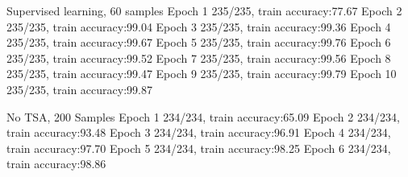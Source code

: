 \documentclass[a4paper]{article}
\begin{document}
Supervised learning, 60 samples
Epoch 1 235/235, train accuracy:77.67%
Epoch 2 235/235, train accuracy:99.04%
Epoch 3 235/235, train accuracy:99.36%
Epoch 4 235/235, train accuracy:99.67%
Epoch 5 235/235, train accuracy:99.76%
Epoch 6 235/235, train accuracy:99.52%
Epoch 7 235/235, train accuracy:99.56%
Epoch 8 235/235, train accuracy:99.47%
Epoch 9 235/235, train accuracy:99.79%
Epoch 10 235/235, train accuracy:99.87%
 
No TSA, 200 Samples
Epoch 1 234/234, train accuracy:65.09%
Epoch 2 234/234, train accuracy:93.48%
Epoch 3 234/234, train accuracy:96.91%
Epoch 4 234/234, train accuracy:97.70%
Epoch 5 234/234, train accuracy:98.25%
Epoch 6 234/234, train accuracy:98.86%
\end{document}
